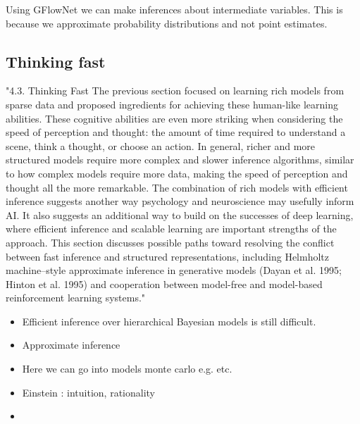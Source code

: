 Using GFlowNet we can make inferences about intermediate variables. This is because we approximate probability distributions and not point estimates.


\subsection{Thinking fast}
\cite{Lake_Ullman_Tenenbaum_Gershman_2017}
"4.3. Thinking Fast The previous section focused on learning rich models from sparse data and proposed ingredients for achieving these human-like learning abilities. These cognitive abilities are even more striking when considering the speed of perception and thought: the amount of time required to understand a scene, think a thought, or choose an action. In general, richer and more structured models require more complex and slower inference algorithms, similar to how complex models require more data, making the speed of perception and thought all the more remarkable. The combination of rich models with efficient inference suggests another way psychology and neuroscience may usefully inform AI. It also suggests an additional way to build on the successes of deep learning, where efficient inference and scalable learning are important strengths of the approach. This section discusses possible paths toward resolving the conflict between fast inference and structured representations, including Helmholtz machine–style approximate inference in generative models (Dayan et al. 1995; Hinton et al. 1995) and cooperation between model-free and model-based reinforcement learning systems."

\begin{itemize}
    \item Efficient inference over hierarchical Bayesian models is still difficult.
    \item Approximate inference
    \item Here we can go into models monte carlo e.g. etc. 
    \item Einstein : intuition, rationality
    \item 
\end{itemize}


